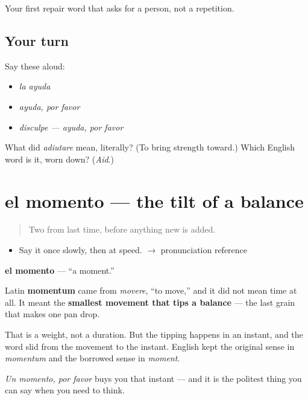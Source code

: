 \begin{grammarlens}[title={What you've built}]
Your first repair word that asks for a person, not a repetition.
\end{grammarlens}

\subsection*{Your turn}
Say these aloud:

\begin{itemize}
\raggedright
  \item \emph{la ayuda}
  \item \emph{ayuda, por favor}
  \item \emph{disculpe — ayuda, por favor}
\end{itemize}

\begin{tcolorbox}[breakable,colback=teal!4,colframe=teal!35!black,title={Before you move on}]
What did \emph{adiutare} mean, literally? (To bring strength toward.) Which English word is it, worn down? (\emph{Aid}.)
\end{tcolorbox}
\section[el momento]{el momento — the tilt of a balance}

\label{lesson:ES-C303-momento}



\begin{quote}
Two from last time, before anything new is added.
\end{quote}

\begin{sounds}
\begin{itemize}
\raggedright
  \item Say it once slowly, then at speed. $\to$ pronunciation reference
\end{itemize}
\end{sounds}

\begin{cousinweb}
\textbf{el momento} — \textquotedblleft{}a moment.\textquotedblright{}

Latin \textbf{momentum} came from \emph{movere}, \textquotedblleft{}to move,\textquotedblright{} and it did not mean time at all. It meant the \textbf{smallest movement that tips a balance} — the last grain that makes one pan drop.

That is a weight, not a duration. But the tipping happens in an instant, and the word slid from the movement to the instant. English kept the original sense in \emph{momentum} and the borrowed sense in \emph{moment}.

\emph{Un momento, por favor} buys you that instant — and it is the politest thing you can say when you need to think.
\end{cousinweb}

